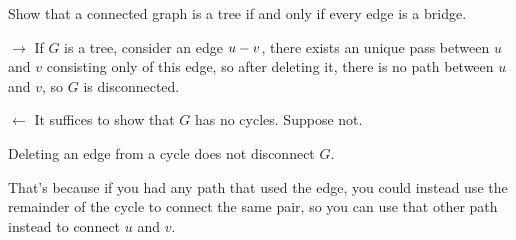 \documentclass[9pt, letterpaper, oneside]{article}
\begin{document}
Show that a connected graph is a tree if and only if every edge is a bridge.

$\to$ If $G$ is a tree, consider an edge $u\--v$, there exists an unique pass between $u$ and $v$ consisting only of this edge, so after deleting it, there is no path between $u$ and $v$, so $G$ is disconnected.

$\leftarrow$ It suffices to show that $G$ has no cycles. Suppose not.

Deleting an edge from a cycle does not disconnect $G$.

That's because if you had any path that used the edge, you could instead use the remainder of the cycle to connect the same pair, so you can use that other path instead to connect $u$ and $v$.
\end{document}
